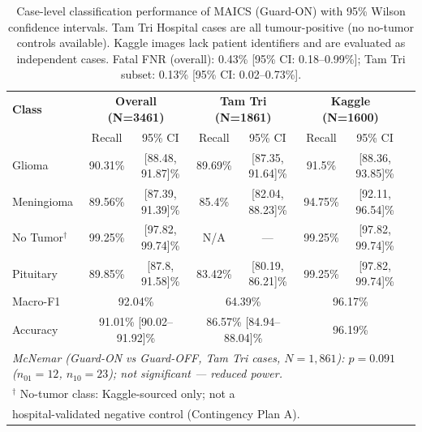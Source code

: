 
\begin{table}[ht]
\caption{Case-level classification performance of MAICS (Guard-ON) with 95\% Wilson
         confidence intervals. Tam Tri Hospital cases are all tumour-positive (no
         no-tumor controls available). Kaggle images lack patient identifiers and
         are evaluated as independent cases. Fatal FNR (overall):
         0.43\% [95\% CI: 0.18--0.99\%];
         Tam Tri subset: 0.13\% [95\% CI: 0.02--0.73\%].}
\label{tab:patient_level}
\centering
\small
\setlength{\tabcolsep}{4pt}
\begin{tabular}{lccccccc}
\toprule
\textbf{Class} 
  & \multicolumn{2}{c}{\textbf{Overall (N=3461)}}
  & \multicolumn{2}{c}{\textbf{Tam Tri (N=1861)}}
  & \multicolumn{2}{c}{\textbf{Kaggle (N=1600)}} \\
  & Recall & 95\% CI & Recall & 95\% CI & Recall & 95\% CI \\
\midrule
    Glioma & 90.31\% & [88.48, 91.87]\% & 89.69\% & [87.35, 91.64]\% & 91.5\% & [88.36, 93.85]\% \\
    Meningioma & 89.56\% & [87.39, 91.39]\% & 85.4\% & [82.04, 88.23]\% & 94.75\% & [92.11, 96.54]\% \\
    No Tumor$^{\dag}$ & 99.25\% & [97.82, 99.74]\% & N/A & --- & 99.25\% & [97.82, 99.74]\% \\
    Pituitary & 89.85\% & [87.8, 91.58]\% & 83.42\% & [80.19, 86.21]\% & 99.25\% & [97.82, 99.74]\% \\
\midrule
    Macro-F1  & \multicolumn{2}{c}{92.04\%} & 
                \multicolumn{2}{c}{64.39\%} & 
                \multicolumn{2}{c}{96.17\%} \\
    Accuracy  & \multicolumn{2}{c}{91.01\% [90.02--91.92]\%} & 
                \multicolumn{2}{c}{86.57\% [84.94--88.04]\%} & 
                \multicolumn{2}{c}{96.19\%} \\
    \midrule
    \multicolumn{7}{l}{\textit{McNemar (Guard-ON vs Guard-OFF, Tam Tri cases, $N=1{,}861$): $p=0.091$ ($n_{01}=12$, $n_{10}=23$); not significant --- reduced power.}} \\
\bottomrule
\multicolumn{7}{l}{\small $^{\dag}$ No-tumor class: Kaggle-sourced only; not a} \\
\multicolumn{7}{l}{\small hospital-validated negative control (Contingency Plan A).} \\
\end{tabular}
\end{table}
